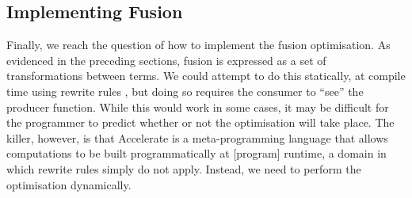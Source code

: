 \subsection{Implementing Fusion}

% 
% 
% 


Finally, we reach the question of how to implement the fusion optimisation. As
evidenced in the preceding sections,
fusion is expressed as a set of transformations between terms. We could attempt
to do this statically, at compile time using rewrite rules \cite{Jones:2001wm},
but doing so requires the consumer to ``see'' the producer function. While this
would work in some cases, it may be difficult for the programmer to predict
whether or not the optimisation will take place. The killer, however, is that
Accelerate is a meta-programming language that allows computations to be built
programmatically at [program] runtime, a domain in which rewrite rules simply do
not apply. Instead, we need to perform the optimisation dynamically.

